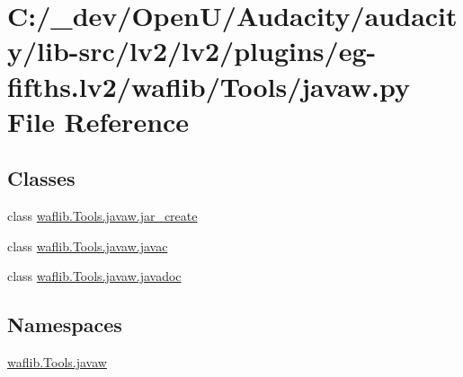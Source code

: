 \hypertarget{lv2_2plugins_2eg-fifths_8lv2_2waflib_2_tools_2javaw_8py}{}\section{C\+:/\+\_\+dev/\+Open\+U/\+Audacity/audacity/lib-\/src/lv2/lv2/plugins/eg-\/fifths.lv2/waflib/\+Tools/javaw.py File Reference}
\label{lv2_2plugins_2eg-fifths_8lv2_2waflib_2_tools_2javaw_8py}
\subsection*{Classes}
\begin{DoxyCompactItemize}
\item 
class \hyperlink{classwaflib_1_1_tools_1_1javaw_1_1jar__create}{waflib.\+Tools.\+javaw.\+jar\+\_\+create}
\item 
class \hyperlink{classwaflib_1_1_tools_1_1javaw_1_1javac}{waflib.\+Tools.\+javaw.\+javac}
\item 
class \hyperlink{classwaflib_1_1_tools_1_1javaw_1_1javadoc}{waflib.\+Tools.\+javaw.\+javadoc}
\end{DoxyCompactItemize}
\subsection*{Namespaces}
\begin{DoxyCompactItemize}
\item 
 \hyperlink{namespacewaflib_1_1_tools_1_1javaw}{waflib.\+Tools.\+javaw}
\end{DoxyCompactItemize}
